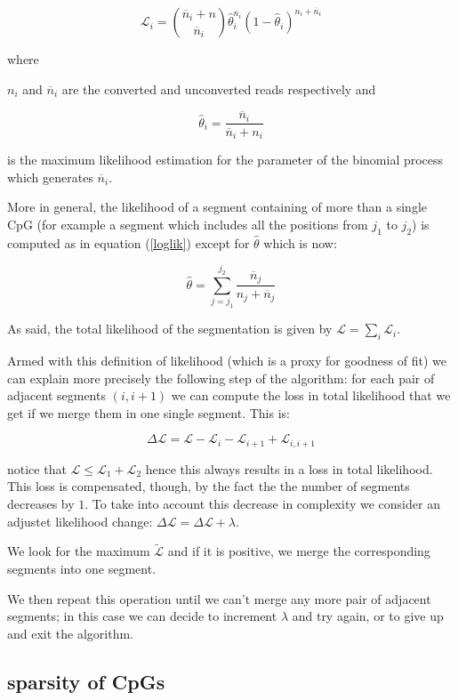 \documentclass[11pt]{amsart}
\newcommand{\lik}{\ensuremath{\mathcal{L}}}
\begin{document}
\[\lik_i={\overline{n}_i+n \choose \overline{n}_i}
	\hat{\theta}_i^{\overline{n}_i}(1-\hat{\theta}_i)^{n_i+\overline{n}_i}\]
\label{loglik}

where

$n_i$ and $\overline{n}_i$ are the converted and unconverted reads respectively 
and

\[\hat{\theta}_i=\frac{\overline{n}_i}{\overline{n}_i+n_i}\]

is the maximum likelihood estimation for the parameter of the binomial process 
which generates $\overline{n}_i$.

More in general, the likelihood of a segment containing of more than a single CpG  
(for example a segment which includes all the positions from $j_1$ to $j_2$) is 
computed as in equation (\ref{loglik}) except for $\hat{\theta}$ which is now:

\[
\hat{\theta}=\sum_{j=j_1}^{j_2} \frac{\overline{n}_j}{n_j+\overline{n}_j}
\]


As said, the total likelihood of the segmentation is given by 
$\mathcal{L}=\sum_i\mathcal{L}_i$.


Armed with this definition of likelihood (which is a proxy for goodness of fit) 
we can explain more precisely the following step of the algorithm:
for each pair of adjacent segments $(i,i+1)$ we can compute the loss in 
total likelihood that we get if we merge them
in one single segment. This is:

\[\Delta \lik=\lik-\mathcal{L}_i-\mathcal{L}_{i+1}+\mathcal{L}_{i,i+1}\]

notice that $\mathcal{L} \leq \mathcal{L}_1+\mathcal{L}_2$ hence this always 
results in a loss in total 
likelihood. This loss is compensated, though, by the fact the the number 
of segments decreases by $1$. To take into account this decrease in 
complexity we consider an adjustet likelihood change:
$\Delta \lik = \Delta \lik+\lambda$.

We look for the maximum $\tilde{\lik}$ and if it is positive, we merge the
corresponding segments into one segment.

We then repeat this operation until we can't merge any more pair of adjacent 
segments; in this case we can decide to increment 
$\lambda$ and try again, or to give up and exit the algorithm.

\subsection{sparsity of CpGs}
\end{document}
